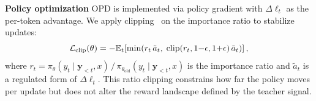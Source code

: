 \documentclass[11pt]{article}
\begin{document}
\vspace{1mm}
\noindent \textbf{Policy optimization} \quad
OPD is implemented via policy gradient with $\Delta\ell_t$ as the per-token advantage. We apply clipping~\cite{schulman2017ppo} on the importance ratio to stabilize updates:
\vspace{-3pt}
\begin{equation}
  \label{eq:ppo-clip}
  \small
  \mathcal{L}_\mathrm{clip}(\theta) = -\mathbb{E}_t\!\left[\min\!\left(r_t \,\tilde{a}_t,\; \mathrm{clip}(r_t, 1{-}\epsilon, 1{+}\epsilon)\,\tilde{a}_t\right)\right],
\vspace{-3pt}
\end{equation}
where $r_t = \pi_\theta(y_t \mid \mathbf{y}_{<t}, x) \,/\, \pi_{\theta_\mathrm{old}}(y_t \mid \mathbf{y}_{<t}, x)$ is the importance ratio and $\tilde{a}_t$ is a regulated form of $\Delta\ell_t$. This ratio clipping constrains how far the policy moves per update but does not alter the reward landscape defined by the teacher signal.



\end{document}
